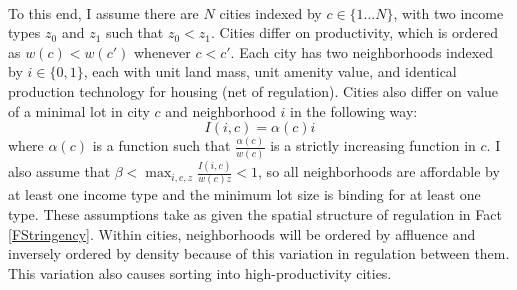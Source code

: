 \documentclass[12pt]{article}
\begin{document}
	\paragraph*{}
	To this end, I assume there are $N$ cities indexed by $c \in \{1 \dots N\}$, with two income types $z_{0}$ and $z_{1}$ such that $z_{0} < z_{1}$. Cities differ on productivity, which is ordered as $w(c) < w(c')$ whenever $c < c'$. Each city has two neighborhoods indexed by $i \in \{0,  1\}$, each with unit land mass, unit amenity value, and identical production technology for housing (net of regulation). Cities also differ on value of a minimal lot in city $c$ and neighborhood $i$ in the following way:
	\begin{equation*}
		I(i, c) = \alpha(c)i
	\end{equation*}
	where $\alpha(c)$ is a function such that $\frac{\alpha(c)}{w(c)}$ is a strictly increasing function in $c$. I also assume that $\beta < \max_{i,c, z}\frac{I(i, c)}{w(c)z} < 1$, so all neighborhoods are affordable by at least one income type and the minimum lot size is binding for at least one type. These assumptions take as given the spatial structure of regulation in Fact \ref{FStringency}. Within cities, neighborhoods will be ordered by affluence and inversely ordered by density because of this variation in regulation between them. This variation also causes sorting into high-productivity cities. 
	
\end{document}
